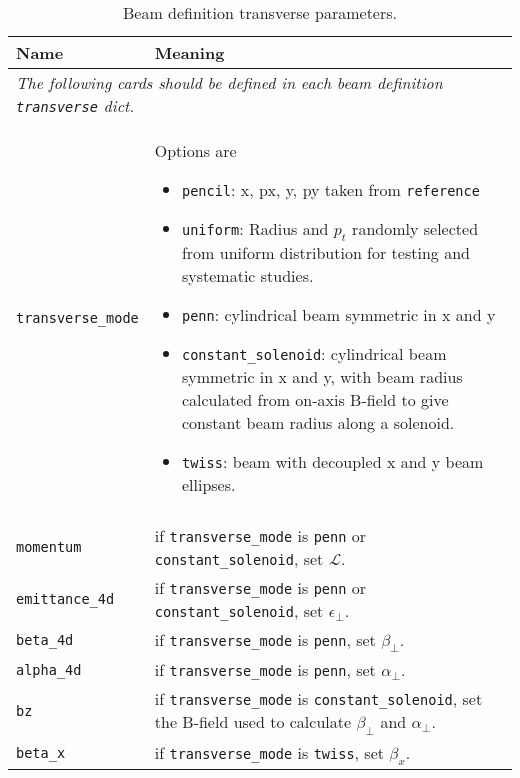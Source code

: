 \begin{table*}
\begin{center}
\caption{Beam definition transverse parameters.}
\begin{tabularx}{\linewidth}{lX}
Name & Meaning \\
\hline
\multicolumn{2}{|l|}{\emph{The following cards should be defined in each beam definition \verb|transverse| dict.}} \\
\hline
\verb|transverse_mode| & Options are
                          \begin{itemize}
                            \setlength{\itemsep}{0mm}
                            \item \verb|pencil|: x, px, y, py taken from \verb|reference|
                            \item \verb|uniform|: Radius and $p_{t}$ randomly selected from uniform distribution for testing and systematic studies.
                            \item \verb|penn|: cylindrical beam symmetric in x and y
                            \item \verb|constant_solenoid|: cylindrical beam symmetric in x and y, with beam radius calculated from on-axis B-field to give constant beam radius along a solenoid.
                            \item \verb|twiss|: beam with decoupled x and y beam ellipses.
                          \end{itemize} \\
\hline
\begin{tabular}{l}\verb|normalised_angular_| \\ \verb|momentum| \end{tabular} & if \verb|transverse_mode| is \verb|penn| or \verb|constant_solenoid|, set $\mathcal{L}$.\\
\verb|emittance_4d| & if \verb|transverse_mode| is \verb|penn| or \verb|constant_solenoid|, set $\epsilon_\perp$.\\
\verb|beta_4d| & if \verb|transverse_mode| is \verb|penn|, set $\beta_\perp$.\\
\verb|alpha_4d| & if \verb|transverse_mode| is \verb|penn|, set $\alpha_\perp$.\\
\verb|bz| & if \verb|transverse_mode| is \verb|constant_solenoid|, set the B-field used to calculate $\beta_\perp$ and $\alpha_\perp$.\\
\hline
\verb|beta_x| & if \verb|transverse_mode| is \verb|twiss|, set $\beta_x$.\\

\end{tabularx}
\end{center}
\end{table*}
